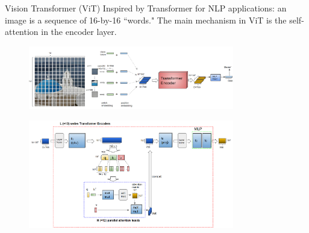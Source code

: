\documentclass[xcolor={dvipsnames,svgnames}]{beamer}
\begin{document}
\begin{frame}{Vision Transformer (ViT)}
Inspired by Transformer for NLP applications: an image is a sequence of 16-by-16 ``words." The main mechanism in ViT is the self-attention in the encoder layer.
      \begin{figure}[H]
        \centering
            \includegraphics[width=0.8\textwidth]{figures/artificial/vit_input.png}
        \end{figure} 
        \begin{figure}[H]
        \centering
            \includegraphics[width=0.8\textwidth]{figures/artificial/vit_encoder.png}
        \end{figure} 
\end{frame}
\end{document}
